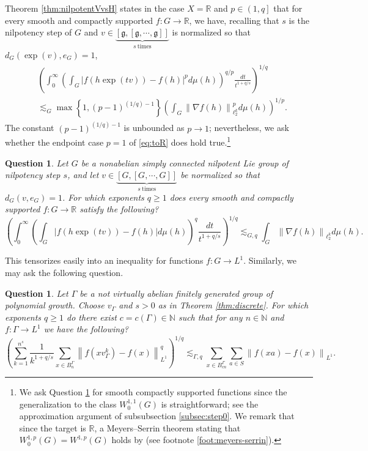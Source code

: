 \documentclass[11pt,reqno]{amsart}
\newtheorem{question}[theorem]{Question}
\newcommand{\1}{\mathbf 1}
\begin{document}
Theorem \ref{thm:nilpotentVvsH} states in the case $X=\mathbb{R}$ and $p\in \left(1,q\right]$ that for every smooth and compactly supported $f:G\to \mathbb{R}$, we have, recalling that $s$ is the nilpotency step of $G$ and $v\in \underbrace{\left[\mathfrak{g},\left[\mathfrak{g},\cdots,\mathfrak{g}\right]\right]}_{s~\mathrm{times}}$ is normalized so that $d_G\left(\exp\left(v\right),e_G\right)=1$,
\begin{align}\label{eq:toR}
\begin{aligned}
&\left(\int_0^\infty \left(\int_{G}\left|f\left(h\exp\left(tv\right)\right)-f\left(h\right)\right|^pd\mu\left(h\right)\right)^{q/p}\frac{dt}{t^{1+q/s}}\right)^{1/q}\\
&\lesssim_G \max\left\{1,\left(p-1\right)^{(1/q)-1}\right\} \left(\int_{G} \left\|\nabla f\left(h\right)\right\|_{\ell_2^k}^p d\mu\left(h\right)\right)^{1/p}.
\end{aligned}
\end{align}
The constant $\left(p-1\right)^{(1/q)-1}$ is unbounded as $p\to 1$; nevertheless, we ask whether the endpoint case $p=1$ of \eqref{eq:toR} does hold true.\footnote{We ask Question \ref{Q:strongest} for smooth compactly supported functions since the generalization to the class $W_0^{1,1}\left(G\right)$ is straightforward; see the approximation argument of subsubsection \ref{subsec:step0}. We remark that since the target is $\mathbb{R}$, a Meyers--Serrin theorem stating that $W_0^{1,p}\left(G\right)=W^{1,p}\left(G\right)$ holds by \cite[Theorem 11.9]{hajlasz2000sobolev} (see footnote \ref{foot:meyers-serrin}).}
\begin{question}\label{Q:strongest}
Let $G$ be a nonabelian simply connected nilpotent Lie group of nilpotency step $s$, and let $v\in \underbrace{\left[G,\left[G,\cdots,G\right]\right]}_{s~\mathrm{times}}$ be normalized so that $d_G\left(v,e_G\right)=1$.
For which exponents $q\ge 1$ does every smooth and compactly supported $f:G\to \mathbb{R}$  satisfy the following?
\begin{equation}\label{eq:p=1}
\left(\int_0^\infty \left(\int_{G}\left|f\left(h\exp\left(tv\right)\right)-f\left(h\right)\right|d\mu\left(h\right)\right)^{q}\frac{dt}{t^{1+q/s}}\right)^{1/q}\lesssim_{G,q} \int_{G} \left\|\nabla f\left(h\right)\right\|_{\ell_2^k} d\mu\left(h\right).
\end{equation}
\end{question}
This tensorizes easily into an inequality for functions $f:G\to L^1$. Similarly, we may ask the following question.
\begin{question}\label{ques:poly}
Let $\Gamma$ be a not virtually abelian finitely generated group of polynomial growth. Choose $v_\Gamma$ and $s>0$ as in Theorem \ref{thm:discrete}. For which exponents $q\ge 1$ do there exist $c=c\left(\Gamma\right)\in \mathbb{N}$ such that for any $n\in \mathbb{N}$ and $f:\Gamma\to L^1$ we have the following?
\[
\left(\sum_{k=1}^{n^s}\frac{1}{k^{1+q/s}}\sum_{x\in B^\Gamma_n} \left\|f\left(xv_\Gamma^k\right)-f\left(x\right)\right\|_{L^1}^q\right)^{1/q}\lesssim_{\Gamma,q} \sum_{x\in B^\Gamma_{cn}} \sum_{a\in S}\left\|f\left(xa\right)-f\left(x\right)\right\|_{L^1}.
\]
\end{question}
\end{document}
